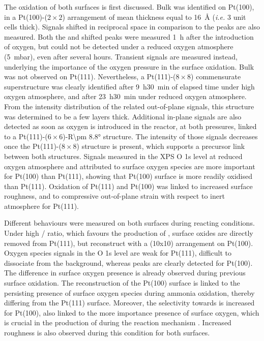 The oxidation of both surfaces is first discussed.
Bulk  was identified on Pt(100), in a Pt(100)-($2\times2$) arrangement of mean thickness equal to \qty{16}{\angstrom} (\textit{i.e.} 3 unit cells thick).
Signals shifted in reciprocal space in comparison to the  peaks are also measured.
Both the  and shifted peaks were measured \qty{1}{\hour} after the introduction of oxygen, but could not be detected under a reduced oxygen atmosphere (\qty{5}{\milli\bar}), even after several hours.
Transient signals are measured instead, underlying the importance of the oxygen pressure in the surface oxidation.
Bulk  was not observed on Pt(111).
Nevertheless, a Pt(111)-($8\times8$) commensurate superstructure was clearly identified after \qty{9}{\hour}\qty{30}{\minute} of elapsed time under high oxygen atmosphere, and after \qty{23}{\hour}\qty{30}{\minute} under reduced oxygen atmosphere.
From the intensity distribution of the related out-of-plane signals, this structure was determined to be a few layers thick.
Additional in-plane signals are also detected as soon as oxygen is introduced in the reactor, at both pressures, linked to a Pt(111)-($6\times6$)-R\ang{\pm 8.8} structure.
The intensity of those signals decreases once the Pt(111)-($8\times8$) structure is present, which supports a precursor link between both structures.
Signals measured in the XPS O 1s level at reduced oxygen atmosphere and attributed to surface oxygen species are more important for Pt(100) than Pt(111), showing that Pt(100) surface is more readily oxidised than Pt(111).
Oxidation of Pt(111) and Pt(100) was linked to increased surface roughness, and to compressive out-of-plane strain with respect to inert atmosphere for Pt(111).

Different behaviours were measured on both surfaces during reacting conditions.
Under high / ratio, which favours the production of , surface oxides are directly removed from Pt(111), but reconstruct with a (10x10) arrangement on Pt(100).
Oxygen species signals in the O 1s level are weak for Pt(111), difficult to dissociate from the background, whereas peaks are clearly detected for Pt(100).
The difference in surface oxygen presence is already observed during previous surface oxidation.
The reconstruction of the Pt(100) surface is linked to the persisting presence of surface oxygen species during ammonia oxidation, thereby differing from the Pt(111) surface.
Moreover, the selectivity towards  is increased for Pt(100), also linked to the more importance presence of surface oxygen, which is crucial in the production of  during the reaction mechanism \parencite{NovellLeruth2005, Offermans2006, Offermans2007, Imbihl2007, NovellLeruth2008}.
Increased roughness is also observed during this condition for both surfaces.

